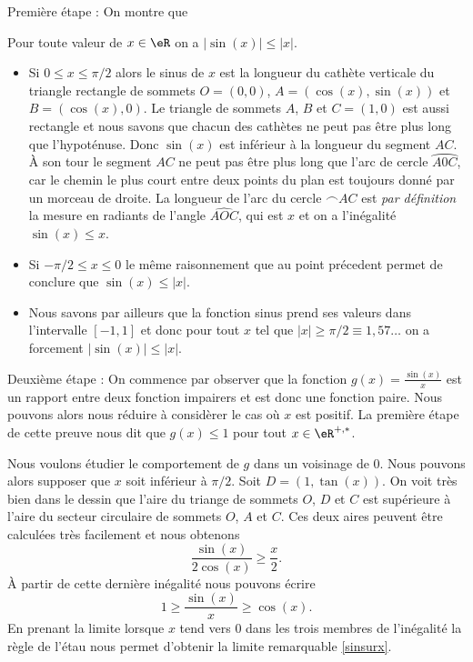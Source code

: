 \begin{description}
  \item{Première étape : } On montre que 
    \begin{lemma}
      Pour toute valeur de $x\in \eR$ on a $|\sin(x)|\leq |x|$. 
    \end{lemma}
    \begin{itemize}
    \item Si $0\leq x\leq \pi/2$ alors le sinus de $x$ est la longueur du cathète verticale du triangle rectangle de sommets $O = (0,0)$, $A = (\cos(x), \sin(x))$ et $B = (\cos(x), 0)$. Le triangle de sommets $A$, $B$ et $C = (1, 0)$ est aussi rectangle et nous savons que chacun des cathètes ne peut pas \^etre plus long que l'hypoténuse. Donc $\sin(x)$ est inférieur à la longueur du segment $AC$. À son tour le segment $AC$ ne peut pas \^etre plus long que l'arc de cercle $\wideparen{A0C}$, car le chemin le plus court entre deux points du plan est toujours donné par un morceau de droite. La longueur de l'arc du cercle $\frown{AC}$ est \emph{par définition} la mesure en radiants de l'angle $\widehat{AOC}$, qui est $x$ et on a l'inégalité $\sin(x)\leq x$. 
    \item Si $-\pi/2\leq x\leq 0$ le m\^eme raisonnement que au point précedent permet de conclure que $\sin(x)\leq |x|$.
    \item Nous savons par ailleurs que la fonction sinus prend ses valeurs dans l'intervalle $[-1,1]$ et donc pour tout $x$ tel que $|x|\geq \pi/2 \equiv 1,57\ldots$ on a forcement $|\sin(x)|\leq |x|$.  
    \end{itemize}
  \item{Deuxième étape :} On commence par observer que la fonction $g(x)=\frac{\sin(x)}{x}$ est un rapport entre deux fonction impairers et est donc une fonction paire. Nous pouvons alors nous réduire à considèrer le cas où $x$ est positif. La première étape de cette preuve nous dit que $g(x)\leq 1$ pour tout $x\in\eR^{+,*}$. 

Nous voulons étudier le comportement de $g$ dans un voisinage de $0$. Nous pouvons alors supposer que $x$ soit inférieur à $\pi/2$. Soit $D = (1, \tan (x))$. On voit très bien dans le dessin que l'aire du triange de sommets $O$, $D$ et $C$ est supérieure à l'aire du secteur circulaire de sommets $O$, $A$ et $C$. Ces deux aires peuvent \^etre calculées très facilement et nous obtenons
\begin{equation*}
  \frac{\sin(x)}{2\cos(x)} \geq \frac{x}{2}.
\end{equation*}
À partir de cette dernière inégalité nous pouvons écrire 
\begin{equation*}
  1\geq \frac{\sin(x)}{x}\geq \cos(x).
\end{equation*}
En prenant la limite lorsque $x$ tend vers $0$ dans les trois membres de l'inégalité la règle de l'étau nous permet d'obtenir la limite remarquable  \eqref{sinsurx}. 
\end{description}

